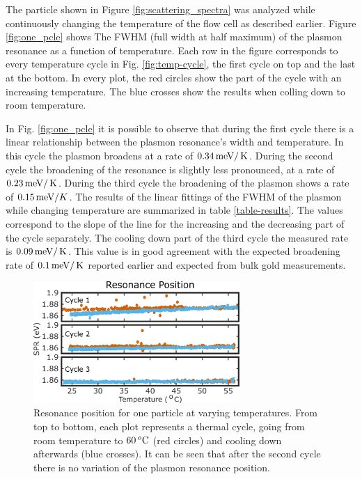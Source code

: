 The particle shown in Figure \ref{fig:scattering_spectra} was analyzed while
continuously changing the temperature of the flow cell as described earlier.
Figure \ref{fig:one_pcle} shows The FWHM (full width at half maximum) of the
plasmon resonance as a function of temperature. Each row in the figure
corresponds to every temperature cycle in Fig. \ref{fig:temp-cycle}, the first
cycle on top and the last at the bottom. In every plot, the red circles show the
part of the cycle with an increasing temperature. The blue crosses show the
results when colling down to room temperature.

In Fig. \ref{fig:one_pcle} it is possible to observe that during the first cycle
there is a linear relationship between the plasmon resonance's width and
temperature. In this cycle the plasmon broadens at a rate of $0.34\,\textrm{meV}/\,\textrm{K}$.
During the second cycle the broadening of the resonance is slightly less
pronounced, at a rate of $0.23\,\textrm{meV}/\,\textrm{K}$. During the third cycle the broadening of
the plasmon shows a rate of $0.15\,\textrm{meV}/K$. The results of the linear fittings of
the FWHM of the plasmon while changing temperature are summarized in table
\ref{table-results}. The values correspond to the slope of the line for the
increasing and the decreasing part of the cycle separately. The cooling down
part of the third cycle the measured rate is $0.09\,\textrm{meV}/\,\textrm{K}$. This value is in
good agreement with the expected broadening rate of $0.1\,\textrm{meV}/\,\textrm{K}$ reported
earlier\cite{Liu2009b,Konrad2013} and expected from bulk gold measurements.

\begin{figure}[tp] \centering
\includegraphics[width=78.2mm]{Chapters/05_WhiteLight/Figures/02_One_Pcle/02_One_Pcle_02.png}
\caption{Resonance position for one particle at varying temperatures. From top
to bottom, each plot represents a thermal cycle, going from room temperature to
$60\,^o\textrm{C}$ (red circles) and cooling down afterwards (blue crosses). It can be
seen that after the second cycle there is no variation of the plasmon resonance
position.}
	\label{fig:one_pcle_spr}
\end{figure}

